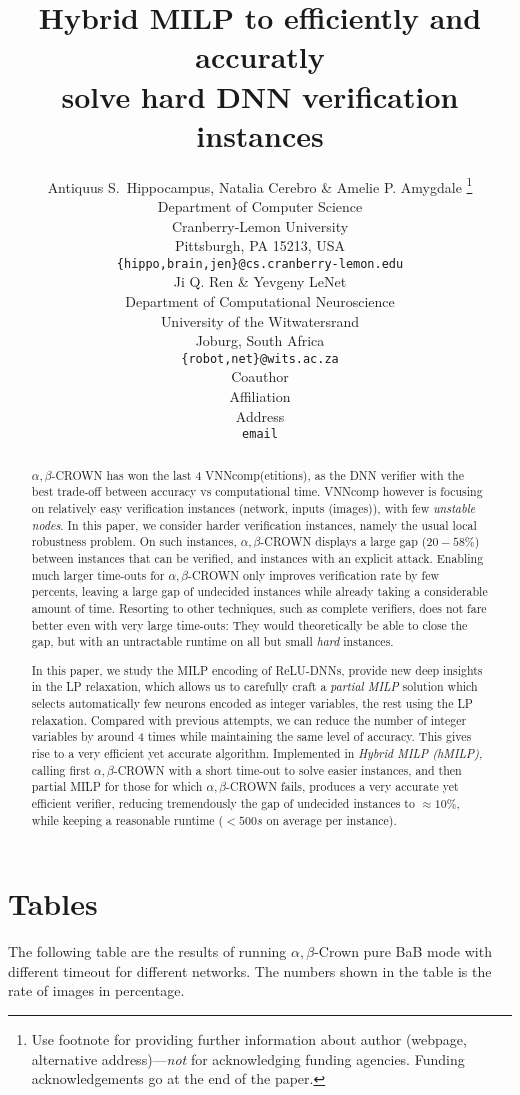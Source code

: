 \documentclass{article} %
\title{Hybrid MILP to efficiently and accuratly \\  solve hard DNN verification instances}
\author{Antiquus S.~Hippocampus, Natalia Cerebro \& Amelie P. Amygdale \thanks{ Use footnote for providing further information
about author (webpage, alternative address)---\emph{not} for acknowledging
funding agencies.  Funding acknowledgements go at the end of the paper.} \\
Department of Computer Science\\
Cranberry-Lemon University\\
Pittsburgh, PA 15213, USA \\
\texttt{\{hippo,brain,jen\}@cs.cranberry-lemon.edu} \\
\And
Ji Q. Ren \& Yevgeny LeNet \\
Department of Computational Neuroscience \\
University of the Witwatersrand \\
Joburg, South Africa \\
\texttt{\{robot,net\}@wits.ac.za} \\
\AND
Coauthor \\
Affiliation \\
Address \\
\texttt{email}
}
\theoremstyle{definition}
\begin{document}
\maketitle

\begin{abstract}
$\alpha,\beta$-CROWN has won the last 4 VNNcomp(etitions), as the DNN verifier with the best 
trade-off between accuracy vs computational time. VNNcomp however is focusing on relatively easy verification instances (network, inputs (images)), 
with few {\em unstable nodes}. In this paper, we consider harder verification instances, namely the usual local robustness problem. On such instances, $\alpha,\beta$-CROWN displays a large gap ($20-58\%$) between instances that can be verified, and instances with an explicit attack. Enabling much larger time-outs for $\alpha,\beta$-CROWN only improves verification rate by few percents, leaving a large gap of undecided instances while already taking a considerable amount of time. Resorting to other techniques, such as complete verifiers, does not fare better even with very large time-outs: They would theoretically be able to close the gap, but with an untractable runtime on all but small {\em hard} instances.

In this paper, we study the MILP encoding of ReLU-DNNs, provide new deep insights in the LP relaxation, which allows us to carefully craft a {\em partial MILP} solution which selects automatically few neurons encoded as integer variables, the rest using the LP relaxation. Compared with previous attempts, we can reduce the number of integer variables by around 4 times while maintaining the same level of accuracy. This gives rise to a very efficient yet accurate algorithm. Implemented in {\em Hybrid MILP (hMILP)}, calling first $\alpha,\beta$-CROWN with a short time-out to solve easier instances, and then partial MILP for those for which $\alpha,\beta$-CROWN fails, produces a very accurate yet efficient verifier, reducing tremendously the gap of undecided instances to $\approx 10\%$, while keeping a reasonable runtime ($<500s$ on average per instance).
\end{abstract}






\section*{Tables}

The following table are the results of running $\alpha,\beta$-Crown pure BaB mode with different timeout for different networks. The numbers shown in the table is the rate of images in percentage.
\end{document}
